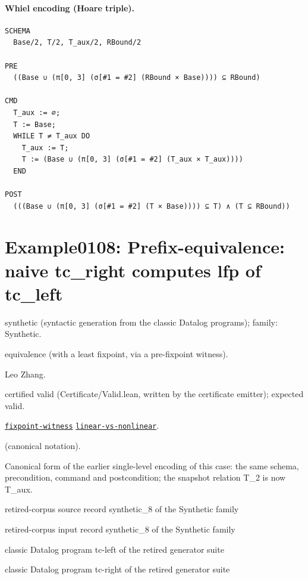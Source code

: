 \documentclass[10pt]{article}
\begin{document}
\paragraph{Whiel encoding (Hoare triple).}

\begin{Verbatim}[fontsize=\scriptsize,breaklines=true,breakanywhere=true,frame=single,framesep=1.5mm]
SCHEMA
  Base/2, T/2, T_aux/2, RBound/2

PRE
  ((Base ∪ (π[0, 3] (σ[#1 = #2] (RBound × Base)))) ⊆ RBound)

CMD
  T_aux := ∅;
  T := Base;
  WHILE T ≠ T_aux DO
    T_aux := T;
    T := (Base ∪ (π[0, 3] (σ[#1 = #2] (T_aux × T_aux))))
  END

POST
  (((Base ∪ (π[0, 3] (σ[#1 = #2] (T × Base)))) ⊆ T) ∧ (T ⊆ RBound))
\end{Verbatim}

\Needspace{0.45\textheight}

\section{Example0108: Prefix-equivalence: naive tc\_right computes lfp of tc\_left}\label{case:Example0108}

\begin{description}[leftmargin=2.6cm,style=nextline,itemsep=1pt]

\item[Category] synthetic (syntactic generation from the classic Datalog programs); family: Synthetic.

\item[Kind] equivalence (with a least fixpoint, via a pre-fixpoint witness).

\item[Contributors] Leo Zhang.

\item[Status] certified valid (Certificate/Valid.lean, written by the certificate emitter); expected valid.

\item[Tags] \hyperref[tag:fixpoint-witness]{\texttt{fixpoint-witness}} \hyperref[tag:linear-vs-nonlinear]{\texttt{linear-vs-nonlinear}}.

\item[Input]  (canonical notation).

\item[Summary] Canonical form of the earlier single-level encoding of this case: the same schema, precondition, command and postcondition; the snapshot relation T\_2 is now T\_aux.

\item[Sources] {\raggedright retired-corpus source record synthetic\_8 of the Synthetic family \par retired-corpus input record synthetic\_8 of the Synthetic family \par classic Datalog program tc-left of the retired generator suite \par classic Datalog program tc-right of the retired generator suite\par}

\end{description}
\end{document}
